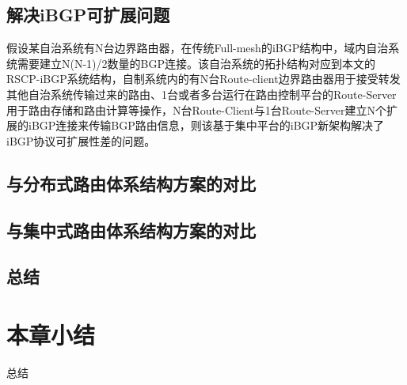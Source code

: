 \subsection{解决iBGP可扩展问题}
假设某自治系统有N台边界路由器，在传统Full-mesh的iBGP结构中，域内自治系统需要建立N(N-1)/2数量的BGP连接。该自治系统的拓扑结构对应到本文的RSCP-iBGP系统结构，自制系统内的有N台Route-client边界路由器用于接受转发其他自治系统传输过来的路由、1台或者多台运行在路由控制平台的Route-Server用于路由存储和路由计算等操作，N台Route-Client与1台Route-Server建立N个扩展的iBGP连接来传输BGP路由信息，则该基于集中平台的iBGP新架构解决了iBGP协议可扩展性差的问题。


\subsection{与分布式路由体系结构方案的对比}
\subsection{与集中式路由体系结构方案的对比}
\subsection{总结}

\section{本章小结}
总结